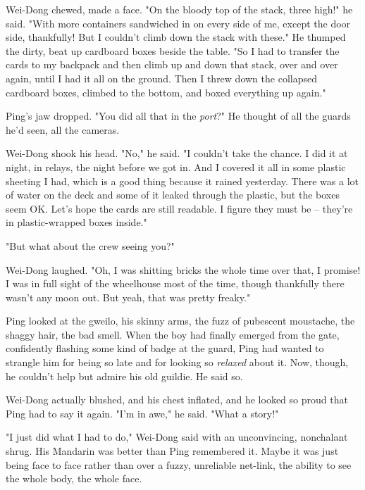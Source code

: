Wei-Dong chewed, made a face. "On the bloody top of the stack,
three high!" he said. "With more containers sandwiched in on every
side of me, except the door side, thankfully! But I couldn't climb
down the stack with these." He thumped the dirty, beat up cardboard
boxes beside the table. "So I had to transfer the cards to my
backpack and then climb up and down that stack, over and over
again, until I had it all on the ground. Then I threw down the
collapsed cardboard boxes, climbed to the bottom, and boxed
everything up again."

Ping's jaw dropped. "You did all that in the \emph{port}?" He
thought of all the guards he'd seen, all the cameras.

Wei-Dong shook his head. "No," he said. "I couldn't take the
chance. I did it at night, in relays, the night before we got in.
And I covered it all in some plastic sheeting I had, which is a
good thing because it rained yesterday. There was a lot of water on
the deck and some of it leaked through the plastic, but the boxes
seem OK. Let's hope the cards are still readable. I figure they
must be -- they're in plastic-wrapped boxes inside."

"But what about the crew seeing you?"

Wei-Dong laughed. "Oh, I was shitting bricks the whole time over
that, I promise! I was in full sight of the wheelhouse most of the
time, though thankfully there wasn't any moon out. But yeah, that
was pretty freaky."

Ping looked at the gweilo, his skinny arms, the fuzz of pubescent
moustache, the shaggy hair, the bad smell. When the boy had finally
emerged from the gate, confidently flashing some kind of badge at
the guard, Ping had wanted to strangle him for being so late and
for looking so \emph{relaxed} about it. Now, though, he couldn't
help but admire his old guildie. He said so.

Wei-Dong actually blushed, and his chest inflated, and he looked so
proud that Ping had to say it again. "I'm in awe," he said. "What a
story!"

"I just did what I had to do," Wei-Dong said with an unconvincing,
nonchalant shrug. His Mandarin was better than Ping remembered it.
Maybe it was just being face to face rather than over a fuzzy,
unreliable net-link, the ability to see the whole body, the whole
face.

